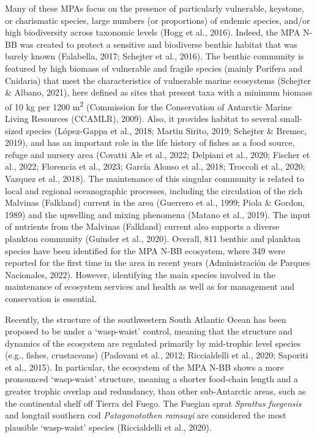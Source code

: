 \documentclass[preprint, 3p,
authoryear]{elsarticle} %
\begin{document}
Many of these MPAs focus on the presence of particularly vulnerable,
keystone, or charismatic species, large numbers (or proportions) of
endemic species, and/or high biodiversity across taxonomic levels (Hogg
et al., 2016). Indeed, the MPA N-BB was created to protect a sensitive
and biodiverse benthic habitat that was barely known (Falabella, 2017;
Schejter et al., 2016). The benthic community is featured by high
biomass of vulnerable and fragile species (mainly Porifera and Cnidaria)
that meet the characteristics of vulnerable marine ecosystems (Schejter
\& Albano, 2021), here defined as sites that present taxa with a minimum
biomass of 10 kg per 1200 m\textsuperscript{2} (Commission for the
Conservation of Antarctic Marine Living Resources (CCAMLR), 2009). Also,
it provides habitat to several small-sized species (López-Gappa et al.,
2018; Martin Sirito, 2019; Schejter \& Bremec, 2019), and has an
important role in the life history of fishes as a food source, refuge
and nursery area (Covatti Ale et al., 2022; Delpiani et al., 2020;
Fischer et al., 2022; Florencia et al., 2023; García Alonso et al.,
2018; Troccoli et al., 2020; Vazquez et al., 2018). The maintenance of
this singular community is related to local and regional oceanographic
processes, including the circulation of the rich Malvinas (Falkland)
current in the area (Guerrero et al., 1999; Piola \& Gordon, 1989) and
the upwelling and mixing phenomena (Matano et al., 2019). The input of
nutrients from the Malvinas (Falkland) current also supports a diverse
plankton community (Guinder et al., 2020). Overall, 811 benthic and
plankton species have been identified for the MPA N-BB ecosystem, where
349 were reported for the first time in the area in recent years
(Administración de Parques Nacionales, 2022). However, identifying the
main species involved in the maintenance of ecosystem services and
health as well as for management and conservation is essential.

Recently, the structure of the southwestern South Atlantic Ocean has
been proposed to be under a `wasp-waist' control, meaning that the
structure and dynamics of the ecosystem are regulated primarily by
mid-trophic level species (e.g., fishes, crustaceans) (Padovani et al.,
2012; Riccialdelli et al., 2020; Saporiti et al., 2015). In particular,
the ecosystem of the MPA N-BB shows a more pronounced `wasp-waist'
structure, meaning a shorter food-chain length and a greater trophic
overlap and redundancy, than other sub-Antarctic areas, such as the
continental shelf off Tierra del Fuego. The Fuegian sprat \emph{Sprattus
fuegensis} and longtail southern cod \emph{Patagonotothen ramsayi} are
considered the most plausible `wasp-waist' species (Riccialdelli et al.,
2020).
\end{document}

